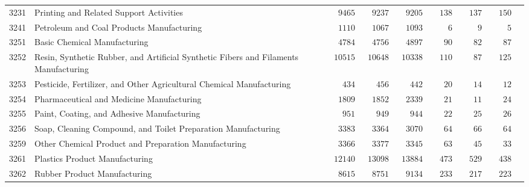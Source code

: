 \documentclass[9pt, oneside]{article}   	%
\begin{document}
\begin{longtable}{lp{3 in}ccccccc}
3231  & Printing and Related Support Activities & $\phantom{00}9465$ & $\phantom{00}9237$ & $\phantom{00}9205$ & $\phantom{00}138$ & $\phantom{00}137$ & $\phantom{00}150$ \\
3241  & Petroleum and Coal Products Manufacturing & $\phantom{00}1110$ & $\phantom{00}1067$ & $\phantom{00}1093$ & $\phantom{0000}6$ & $\phantom{0000}9$ & $\phantom{0000}5$ \\
3251  & Basic Chemical Manufacturing & $\phantom{00}4784$ & $\phantom{00}4756$ & $\phantom{00}4897$ & $\phantom{000}90$ & $\phantom{000}82$ & $\phantom{000}87$ \\
3252  & Resin, Synthetic Rubber, and Artificial Synthetic Fibers and Filaments Manufacturing & $\phantom{0}10515$ & $\phantom{0}10648$ & $\phantom{0}10338$ & $\phantom{00}110$ & $\phantom{000}87$ & $\phantom{00}125$ \\
3253  & Pesticide, Fertilizer, and Other Agricultural Chemical Manufacturing & $\phantom{000}434$ & $\phantom{000}456$ & $\phantom{000}442$ & $\phantom{000}20$ & $\phantom{000}14$ & $\phantom{000}12$ \\
3254  & Pharmaceutical and Medicine Manufacturing & $\phantom{00}1809$ & $\phantom{00}1852$ & $\phantom{00}2339$ & $\phantom{000}21$ & $\phantom{000}11$ & $\phantom{000}24$ \\
3255  & Paint, Coating, and Adhesive Manufacturing & $\phantom{000}951$ & $\phantom{000}949$ & $\phantom{000}944$ & $\phantom{000}22$ & $\phantom{000}25$ & $\phantom{000}26$ \\
3256  & Soap, Cleaning Compound, and Toilet Preparation Manufacturing & $\phantom{00}3383$ & $\phantom{00}3364$ & $\phantom{00}3070$ & $\phantom{000}64$ & $\phantom{000}66$ & $\phantom{000}64$ \\
3259  & Other Chemical Product and Preparation Manufacturing & $\phantom{00}3366$ & $\phantom{00}3377$ & $\phantom{00}3345$ & $\phantom{000}63$ & $\phantom{000}45$ & $\phantom{000}33$ \\
3261  & Plastics Product Manufacturing & $\phantom{0}12140$ & $\phantom{0}13098$ & $\phantom{0}13884$ & $\phantom{00}473$ & $\phantom{00}529$ & $\phantom{00}438$ \\
3262  & Rubber Product Manufacturing & $\phantom{00}8615$ & $\phantom{00}8751$ & $\phantom{00}9134$ & $\phantom{00}233$ & $\phantom{00}217$ & $\phantom{00}223$ \\


\end{longtable}
\end{document}
